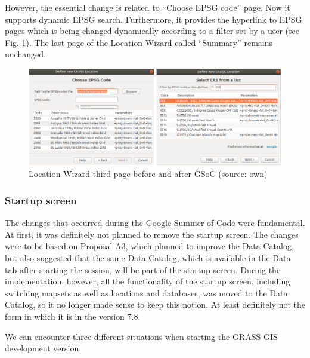 \documentclass[a4paper,10pt,twoside]{article}
\begin{document}
\newpage
However, the essential change is related to ``Choose EPSG code'' page. Now it supports dynamic EPSG search. Furthermore, it provides the hyperlink to EPSG pages which is being changed dynamically according to a filter set by a user (see Fig. \ref{fig:loc_wiz_3}). The last page of the Location Wizard called ``Summary'' remains unchanged.


\vspace{0.3cm}
\begin{figure}[hbt!] 
\begin{center}
\includegraphics[width=15cm]{../pictures/loc_wiz_3.png} 
\caption[Location Wizard third page before and after GSoC)]{Location Wizard third page before and after GSoC (source: own)}
\label{fig:loc_wiz_3}
\end{center}
\end{figure}


\subsubsection{Startup screen}

The changes that occurred during the Google Summer of Code were fundamental. At first, it was definitely not planned to remove the startup screen. The changes were to be based on Proposal A3, which planned to improve the Data Catalog, but also suggested that the same Data Catalog, which is available in the Data tab after starting the session, will be part of the startup screen.
During the implementation, however, all the functionality of the startup screen, including switching mapsets as well as locations and databases, was moved to the Data Catalog, so it no longer made sense to keep this notion. At least definitely not the form in which it is in the version 7.8.

\noindent We can encounter three different situations when starting the GRASS GIS development version:
\end{document}
